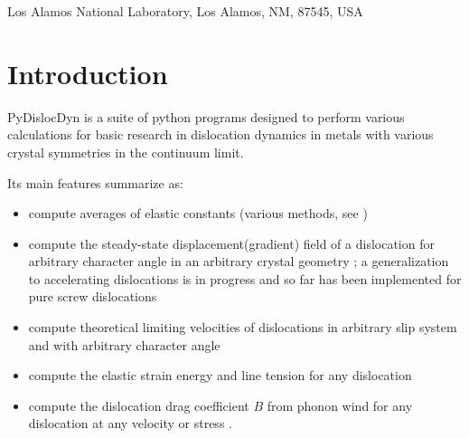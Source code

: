 \documentclass[11pt,letterpaper,oneside,pdftex]{article}
\title{\texorpdfstring{\begin{flushright}
			{\small LA-UR-22-28074}
		\end{flushright}\vspace{2em}}{}%
	PyDislocDyn --- Code Manual}
\author{Daniel N. Blaschke}
\date{Aug 1, 2022}
\begin{document}
\maketitle

\thispagestyle{empty}
\begin{center}
	\vspace{-0.3cm}
	Los Alamos National Laboratory, Los Alamos, NM, 87545, USA
	\\[0.5cm]
	{}
\end{center}

\tableofcontents
\pagebreak

\section{Introduction}

PyDislocDyn \cite{pydislocdyn} is a suite of python programs designed to perform various calculations for basic research in dislocation dynamics in metals with various crystal symmetries in the continuum limit.

Its main features summarize as:
\begin{itemize}
\item compute averages of elastic constants (various methods, see \cite{Blaschke:2017Poly})
\item compute the steady-state displacement(gradient) field of a dislocation for arbitrary character angle in an arbitrary crystal geometry \cite{Bacon:1980,Hirth:1982}; a generalization to accelerating dislocations is in progress and so far has been implemented for pure screw dislocations \cite{Blaschke:2020acc}
\item compute theoretical limiting velocities of dislocations in arbitrary slip system and with arbitrary character angle \cite{Blaschke:2021vcrit,Blaschke:2020MD,Teutonico:1961,Barnett:1973b}
\item compute the elastic strain energy and line tension for any dislocation \cite{Blaschke:2017lten}
\item compute the dislocation drag coefficient $B$ from phonon wind for any dislocation at any velocity \cite{Blaschke:BpaperRpt,Blaschke:2018anis,Blaschke:2019fits,Blaschke:2019Bpap} or stress \cite{Blaschke:2019a,Blaschke:2021impact,Blaschke:2021temperature}.
\end{itemize}
\end{document}
